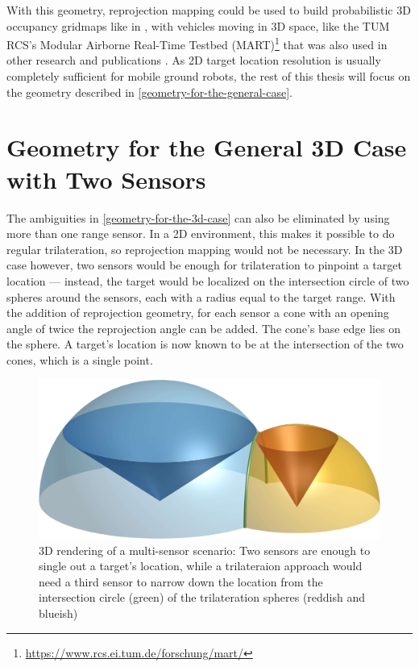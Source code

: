 With this geometry, reprojection mapping could be used to build probabilistic 3D occupancy gridmaps like in \cite{Hornung2013}, with vehicles moving in 3D space, like the TUM RCS's Modular Airborne Real-Time Testbed (MART)\footnote{\url{https://www.rcs.ei.tum.de/forschung/mart/}} that was also used in other research and publications \cite{Becker2015}.
As 2D target location resolution is usually completely sufficient for mobile ground robots, the rest of this thesis will focus on the geometry described in \cref{geometry-for-the-general-case}.

\section{Geometry for the General 3D Case with Two Sensors} \label{multisensor}
The ambiguities in \cref{geometry-for-the-3d-case} can also be eliminated by using more than one range sensor. In a 2D environment, this makes it possible to do regular trilateration, so reprojection mapping would not be necessary. In the 3D case however, two sensors would be enough for trilateration to pinpoint a target location --- instead, the target would be localized on the intersection circle of two spheres around the sensors, each with a radius equal to the target range. With the addition of reprojection geometry, for each sensor a cone with an opening angle of twice the reprojection angle can be added. The cone's base edge lies on the sphere. A target's location is now known to be at the intersection of the two cones, which is a single point.

\begin{figure}
    \centering
    \includegraphics[max width=.75\textwidth]{gfx/diagrams/multisensor.jpg}
    \caption{3D rendering of a multi-sensor scenario: Two sensors are enough to single out a target's location, while a trilateraion approach would need a third sensor to narrow down the location from the intersection circle (green) of the trilateration spheres (reddish and blueish)}
    \label{fig:multisensor}
\end{figure}

